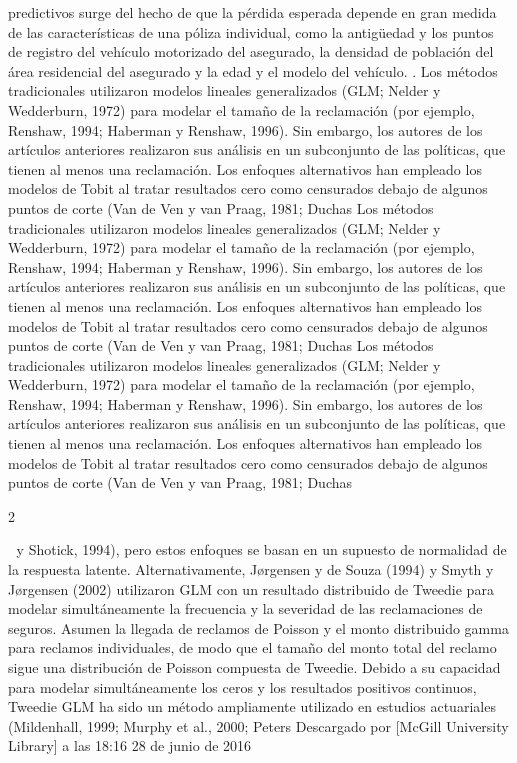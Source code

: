 \documentclass[]{article}
\begin{document}
predictivos surge del hecho de que la pérdida esperada depende en gran
medida de las características de una póliza individual, como la
antigüedad y los puntos de registro del vehículo motorizado del
asegurado, la densidad de población del área residencial del asegurado y
la edad y el modelo del vehículo. . Los métodos tradicionales utilizaron
modelos lineales generalizados (GLM; Nelder y Wedderburn, 1972) para
modelar el tamaño de la reclamación (por ejemplo, Renshaw, 1994;
Haberman y Renshaw, 1996). Sin embargo, los autores de los artículos
anteriores realizaron sus análisis en un subconjunto de las políticas,
que tienen al menos una reclamación. Los enfoques alternativos han
empleado los modelos de Tobit al tratar resultados cero como censurados
debajo de algunos puntos de corte (Van de Ven y van Praag, 1981; Duchas
Los métodos tradicionales utilizaron modelos lineales generalizados
(GLM; Nelder y Wedderburn, 1972) para modelar el tamaño de la
reclamación (por ejemplo, Renshaw, 1994; Haberman y Renshaw, 1996). Sin
embargo, los autores de los artículos anteriores realizaron sus análisis
en un subconjunto de las políticas, que tienen al menos una reclamación.
Los enfoques alternativos han empleado los modelos de Tobit al tratar
resultados cero como censurados debajo de algunos puntos de corte (Van
de Ven y van Praag, 1981; Duchas Los métodos tradicionales utilizaron
modelos lineales generalizados (GLM; Nelder y Wedderburn, 1972) para
modelar el tamaño de la reclamación (por ejemplo, Renshaw, 1994;
Haberman y Renshaw, 1996). Sin embargo, los autores de los artículos
anteriores realizaron sus análisis en un subconjunto de las políticas,
que tienen al menos una reclamación. Los enfoques alternativos han
empleado los modelos de Tobit al tratar resultados cero como censurados
debajo de algunos puntos de corte (Van de Ven y van Praag, 1981; Duchas

2

 y Shotick, 1994), pero estos enfoques se basan en un supuesto de
normalidad de la respuesta latente. Alternativamente, Jørgensen y de
Souza (1994) y Smyth y Jørgensen (2002) utilizaron GLM con un resultado
distribuido de Tweedie para modelar simultáneamente la frecuencia y la
severidad de las reclamaciones de seguros. Asumen la llegada de reclamos
de Poisson y el monto distribuido gamma para reclamos individuales, de
modo que el tamaño del monto total del reclamo sigue una distribución de
Poisson compuesta de Tweedie. Debido a su capacidad para modelar
simultáneamente los ceros y los resultados positivos continuos, Tweedie
GLM ha sido un método ampliamente utilizado en estudios actuariales
(Mildenhall, 1999; Murphy et al., 2000; Peters Descargado por {[}McGill
University Library{]} a las 18:16 28 de junio de 2016
\end{document}

